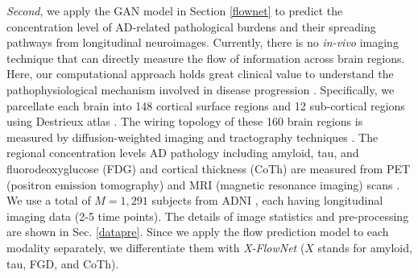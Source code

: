 \documentclass{article}
\begin{document}
 \textit{Second}, we apply the GAN model in Section \ref{flownet} to predict the concentration level of AD-related pathological burdens and their spreading pathways from longitudinal neuroimages. Currently, there is no \textit{in-vivo} imaging technique that can directly measure the flow of information across brain regions. Here, our computational approach holds great clinical value to understand the pathophysiological  mechanism involved in disease progression \cite{jones2017tau}. Specifically, we parcellate each brain into 148 cortical surface regions and 12 sub-cortical regions using Destrieux atlas \cite{destrieux2010automatic}. The wiring topology of these 160 brain regions is measured by diffusion-weighted imaging \cite{bammer2003basic} and tractography techniques \cite{glasser2008dti}. The regional concentration levels AD pathology including amyloid, tau, and  fluorodeoxyglucose (FDG) and cortical thickness (CoTh) are measured from PET (positron emission tomography) and MRI (magnetic resonance imaging) scans \cite{jack2018nia}. We use a total of $M=1,291$ subjects from ADNI \cite{ADNI}, each having longitudinal imaging data (2-5 time points). The details of image statistics and pre-processing are shown in Sec. \ref{datapre}. Since we apply the flow prediction model to each modality separately, we differentiate them with \textit{X-FlowNet} ($X$ stands for amyloid, tau, FGD, and CoTh).

\end{document}
